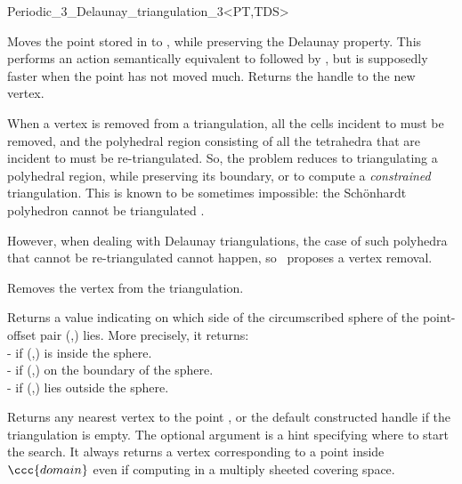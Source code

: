 \begin{ccRefClass}{Periodic_3_Delaunay_triangulation_3<PT,TDS>}

{Moves the point stored in  to , while preserving the Delaunay
property.  This performs an action semantically equivalent to 
followed by , but is supposedly faster when the point has
not moved much.  Returns the handle to the new vertex.
}


When a vertex  is removed from a triangulation, all the cells
incident to  must be removed, and the polyhedral region
consisting of all the tetrahedra that are incident to  must be
re-triangulated. 
So, the problem reduces to triangulating a polyhedral
region, while preserving its boundary, or to compute a
\textit{constrained} triangulation. This is known to be sometimes
impossible: the Sch\"onhardt polyhedron cannot be triangulated
\cite{cgal:s-cgehd-98}. 

However, when dealing with Delaunay triangulations, the case of such
polyhedra that cannot be re-triangulated cannot happen, so \cgal\
proposes a vertex removal.

{Removes the vertex  from the triangulation.}


{Returns a value indicating on which side of the circumscribed sphere
of \ccc{c} the point-offset pair (\ccc{p},\ccc{off}) lies. More
precisely, it returns:\\ 
-  if (,) is inside the sphere.\\
- \ccc{ON_BOUNDARY} if (,) on the boundary of the sphere.\\
- \ccc{ON_UNBOUNDED_SIDE} if (\ccc{p},\ccc{off}) lies outside the
sphere.
}

{Returns any nearest vertex to the point \ccc{p}, or the default constructed
handle if the triangulation is empty.  The optional argument \ccc{c} is a hint
specifying where to start the search. It always returns a vertex
corresponding to a point inside $\ccc{domain}$ even if computing in a
multiply sheeted covering space.
}


\end{ccRefClass}
